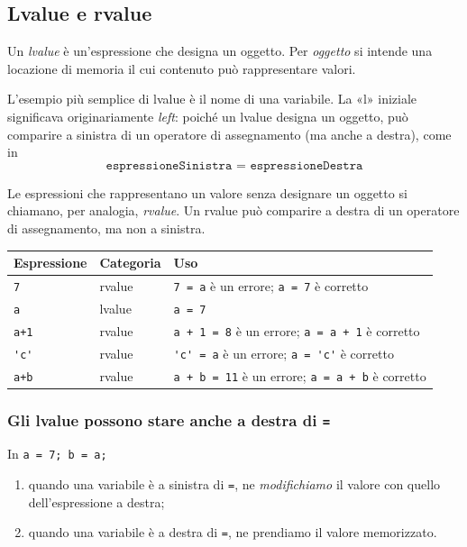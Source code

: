 \documentclass[11pt,a4paper]{article}
\begin{document}
\subsection{Lvalue e rvalue}

\begin{definizione}
Un \emph{lvalue} è un'espressione che designa un oggetto. Per \emph{oggetto} si intende una locazione di memoria il cui contenuto può rappresentare valori.
\end{definizione}

L'esempio più semplice di lvalue è il nome di una variabile. La «l» iniziale significava originariamente \emph{left}: poiché un lvalue designa un oggetto, può comparire a sinistra di un operatore di assegnamento (ma anche a destra), come in
\[
\texttt{espressioneSinistra = espressioneDestra}
\]

Le espressioni che rappresentano un valore senza designare un oggetto si chiamano, per analogia, \emph{rvalue}. Un rvalue può comparire a destra di un operatore di assegnamento, ma non a sinistra.

\begin{esempio}
\begin{center}
\begin{tabular}{lll}
\toprule
Espressione & Categoria & Uso \\
\midrule
\lstinline|7|   & rvalue & \lstinline|7 = a| è un errore; \lstinline|a = 7| è corretto\\
\lstinline|a|   & lvalue & \lstinline|a = 7|\\
\lstinline|a+1| & rvalue & \lstinline|a + 1 = 8| è un errore; \lstinline|a = a + 1| è corretto\\
\lstinline|'c'| & rvalue & \lstinline|'c' = a| è un errore; \lstinline|a = 'c'| è corretto\\
\lstinline|a+b| & rvalue & \lstinline|a + b = 11| è un errore; \lstinline|a = a + b| è corretto\\
\bottomrule
\end{tabular}
\end{center}
\end{esempio}

\subsubsection{Gli lvalue possono stare anche a destra di \texorpdfstring{\lstinline|=|}{=}}

In \lstinline|a = 7; b = a;|
\begin{enumerate}
    \item quando una variabile è a sinistra di \lstinline|=|, ne \emph{modifichiamo} il valore con quello dell'espressione a destra;
    \item quando una variabile è a destra di \lstinline|=|, ne prendiamo il valore memorizzato.
\end{enumerate}
\end{document}
